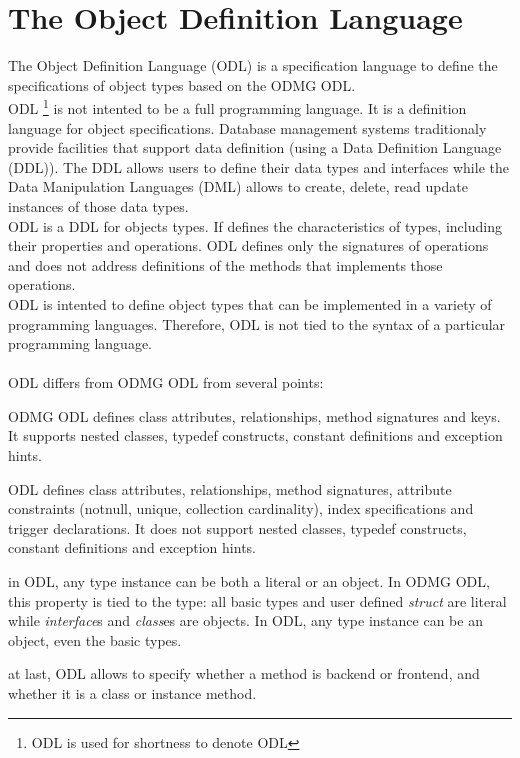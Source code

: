 

\newcommand{\mantitle}{\textsc{Object Definition Language}}


\tableofcontents

\chapter{The Object Definition Language}

The \eyedb Object Definition Language (ODL) is a specification language
to define the specifications of object types based on the ODMG ODL.\\
ODL \footnote{ODL is used for shortness to denote \eyedb ODL} 
is not intented to be a full programming language. It is
a definition language for object specifications. Database management
systems traditionaly provide facilities that support
data definition (using a Data Definition Language (DDL)). The DDL allows
users to define their data types and interfaces while the
Data Manipulation Languages (DML) allows to create, delete, read update
instances of those data types.\\
ODL is a DDL for objects types.
If defines the characteristics of types, including their properties
and operations.
ODL defines only the signatures of operations and does not address
definitions of the methods that implements those operations.
\\
ODL is intented to define object types that can be implemented
in a variety of programming languages. Therefore, ODL is not tied
to the syntax of a particular programming language.\\\\
\eyedb ODL differs from ODMG ODL from several points:
\bi
\item ODMG ODL defines class attributes, relationships, method signatures and keys.
It supports nested classes, typedef constructs, constant definitions and
exception hints.
\item \eyedb ODL defines class attributes, relationships, method signatures,
attribute constraints (notnull, unique, collection cardinality), index
specifications and trigger declarations. It does not support
nested classes, typedef constructs, constant definitions and
exception hints.
\item in \eyedb ODL, any type instance can be both a literal or
an object. In ODMG ODL, this property is tied to the type: all
basic types and user defined \emph{struct} are literal while \emph{interface}s
and \emph{class}es are objects.
In \eyedb ODL, any type instance can be an object, even the basic types.
\item at last, \eyedb ODL allows to specify whether a method is backend or frontend,
and whether it is a class or instance method.
\ei

